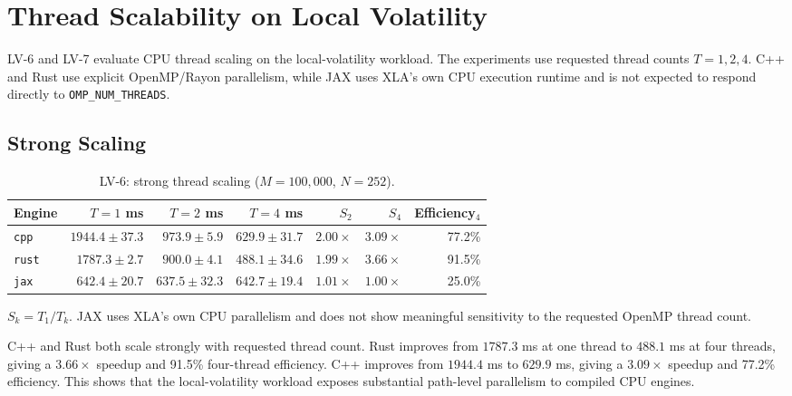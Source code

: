 \section{Thread Scalability on Local Volatility}
\label{sec:results-thread-scalability}

LV-6 and LV-7 evaluate CPU thread scaling on the local-volatility workload.
The experiments use requested thread counts \(T=1,2,4\).  C++ and Rust use
explicit OpenMP/Rayon parallelism, while JAX uses XLA's own CPU execution
runtime and is not expected to respond directly to \texttt{OMP\_NUM\_THREADS}.

\subsection{Strong Scaling}
\label{subsec:results-lv6-strong}

\begin{table}[htbp]
\centering
\small
\begin{threeparttable}
\caption{LV-6: strong thread scaling (\(M=100{,}000\), \(N=252\)).}
\label{tab:lv6-strong-scaling}
\begin{tabular}{lrrrrrr}
\toprule
\textbf{Engine}
& \textbf{\(T=1\) ms}
& \textbf{\(T=2\) ms}
& \textbf{\(T=4\) ms}
& \textbf{\(S_2\)}
& \textbf{\(S_4\)}
& \textbf{Efficiency\(_4\)} \\
\midrule
\texttt{cpp}
& \(1944.4\pm37.3\)
& \(973.9\pm5.9\)
& \(629.9\pm31.7\)
& \(2.00\times\)
& \(3.09\times\)
& 77.2\% \\
\texttt{rust}
& \(1787.3\pm2.7\)
& \(900.0\pm4.1\)
& \(488.1\pm34.6\)
& \(1.99\times\)
& \(3.66\times\)
& 91.5\% \\
\texttt{jax}
& \(642.4\pm20.7\)
& \(637.5\pm32.3\)
& \(642.7\pm19.4\)
& \(1.01\times\)
& \(1.00\times\)
& 25.0\% \\
\bottomrule
\end{tabular}
\begin{tablenotes}
\footnotesize
\item \(S_k = T_1/T_k\).  JAX uses XLA's own CPU parallelism and does not
show meaningful sensitivity to the requested OpenMP thread count.
\end{tablenotes}
\end{threeparttable}
\end{table}

C++ and Rust both scale strongly with requested thread count.  Rust improves
from \(1787.3\) ms at one thread to \(488.1\) ms at four threads, giving a
\(3.66\times\) speedup and 91.5\% four-thread efficiency.  C++ improves from
\(1944.4\) ms to \(629.9\) ms, giving a \(3.09\times\) speedup and 77.2\%
efficiency.  This shows that the local-volatility workload exposes
substantial path-level parallelism to compiled CPU engines.

